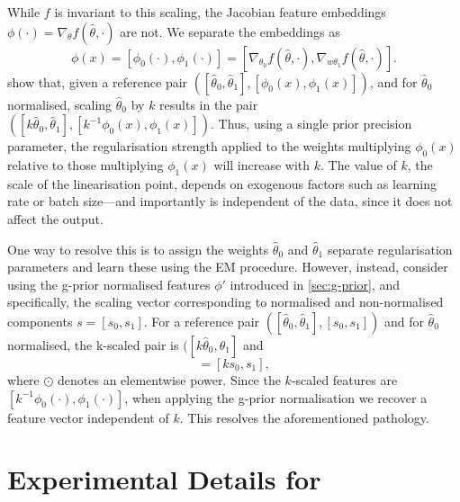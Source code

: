 While $f$ is invariant to this scaling, the Jacobian feature embeddings $\phi(\cdot) = \nabla_\theta f(\hat{\theta}, \cdot)$ are not. We separate the embeddings as 
\begin{equation}
    \phi(x) = [\phi_{0}(\cdot), \phi_{1}(\cdot)] = [\nabla_{\theta_0}f(\hat{\theta}, \cdot), \nabla_{w\theta_1}f(\hat{\theta}, \cdot)].
\end{equation}
\textcite{antoran2022linearised} show that, given a reference pair $([\hat{\theta}_{0}, \hat{\theta}_{1}], [\phi_{0}(x), \phi_{1}(x)])$, and for $\hat{\theta}_{0}$ normalised, scaling $\hat{\theta}_0$ by $k$ results in the pair $([ k \hat{\theta}_{0}, \hat{\theta}_{1}], [k^{-1} \phi_{0}(x), \phi_{1}(x)])$. Thus, using a single prior precision parameter, the regularisation strength applied to the weights multiplying $\phi_{0}(x)$ relative to those multiplying $\phi_{1}(x)$ will increase with $k$. The value of $k$, the scale of the linearisation point, depends on exogenous factors such as learning rate or batch size---and importantly is independent of the data, since it does not affect the output.

One way to resolve this is to assign the weights $\hat{\theta}_0$ and $\hat{\theta}_1$ separate regularisation parameters and learn these using the EM procedure. However, instead, consider using the g-prior normalised features $\phi'$ introduced in \cref{sec:g-prior}, and specifically, the scaling vector corresponding to normalised and non-normalised components $s = [s_{0}, s_{1}]$. For a reference pair $([\hat{\theta}_{0}, \hat{\theta}_{1}], [s_{0}, s_{1}])$ and for $\hat{\theta}_{0}$ normalised, the k-scaled pair is $([ k \hat{\theta}_{0}, \hat{\theta}_{1}]$ and 
\begin{equation*}
   [ \text{diag}(k^{-1} \Phi_{0}^T\mathrm{B} \Phi_{0} k^{-1})^{\odot -\frac{1}{2}},\,\, \text{diag}(\Phi_{1}^T\mathrm{B} \Phi_{1})^{\odot-\frac{1}{2}} ] = [k s_{0}, s_{1}],
\end{equation*}
where $\odot$ denotes an elementwise power. Since the $k$-scaled features are $[k^{-1} \phi_{0}(\cdot), \phi_{1}(\cdot)]$, when applying the g-prior normalisation we recover a feature vector independent of $k$. This resolves the aforementioned pathology.

\section{Experimental Details for }

